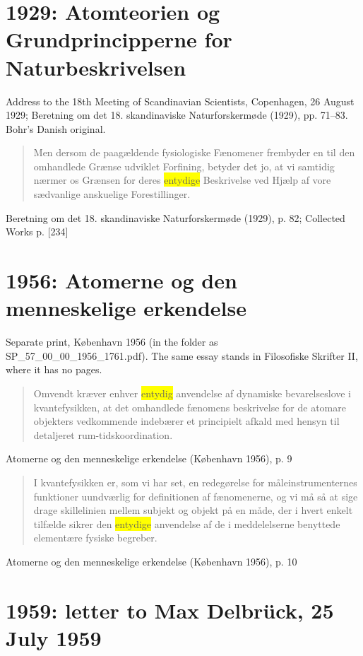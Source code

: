 \documentclass[11pt]{article}
\newcommand{\dcite}[1]{{\nopagebreak\raggedleft\small #1\par}\medskip}
\newcommand{\tlg}[1]{{\setlength{\fboxsep}{0.8pt}\colorbox{yellow}{#1}}}
\begin{document}
\section{1929: Atomteorien og Grundprincipperne for Naturbeskrivelsen}

\noindent Address to the 18th Meeting of Scandinavian Scientists, Copenhagen, 26 August 1929; Beretning om det 18. skandinaviske Naturforskermøde (1929), pp. 71–83. Bohr's Danish original.

\begin{quote}
Men dersom de paagældende fysiologiske Fænomener frembyder en til den omhandlede Grænse udviklet Forfining, betyder det jo, at vi samtidig nærmer os Grænsen for deres \tlg{entydige} Beskrivelse ved Hjælp af vore sædvanlige anskuelige Forestillinger.
\end{quote}
\dcite{Beretning om det 18. skandinaviske Naturforskermøde (1929), p. 82; Collected Works p. [234]}

\section{1956: Atomerne og den menneskelige erkendelse}

\noindent Separate print, København 1956 (in the folder as SP\_57\_00\_00\_1956\_1761.pdf). The same essay stands in Filosofiske Skrifter II, where it has no pages.

\begin{quote}
Omvendt kræver enhver \tlg{entydig} anvendelse af dynamiske bevarelseslove i kvantefysikken, at det omhandlede fænomens beskrivelse for de atomare objekters vedkommende indebærer et principielt afkald med hensyn til detaljeret rum-tidskoordination.
\end{quote}
\dcite{Atomerne og den menneskelige erkendelse (København 1956), p. 9}

\begin{quote}
I kvantefysikken er, som vi har set, en redegørelse for måleinstrumenternes funktioner uundværlig for definitionen af fænomenerne, og vi må så at sige drage skillelinien mellem subjekt og objekt på en måde, der i hvert enkelt tilfælde sikrer den \tlg{entydige} anvendelse af de i meddelelserne benyttede elementære fysiske begreber.
\end{quote}
\dcite{Atomerne og den menneskelige erkendelse (København 1956), p. 10}

\section{1959: letter to Max Delbrück, 25 July 1959}
\end{document}
